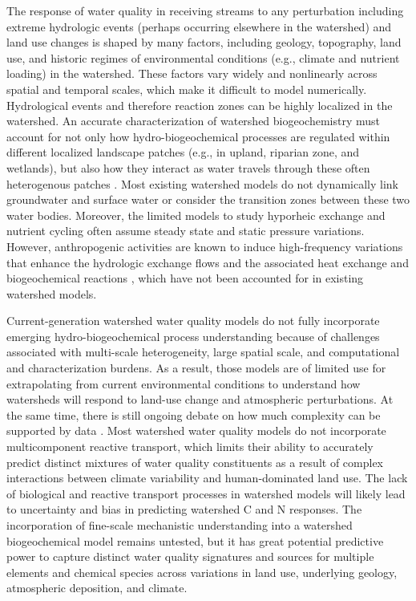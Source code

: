 \documentclass[preprint,review, 12pt]{elsarticle}
\begin{document}
 The response of water quality in receiving streams to any perturbation including extreme hydrologic events (perhaps occurring elsewhere in the watershed) and land use changes is shaped by many factors, including geology, topography, land use, and historic regimes of environmental conditions (e.g., climate and nutrient loading) in the watershed. These factors vary widely and nonlinearly across spatial and temporal scales, which make it difficult to model numerically. Hydrological events \citep{Lu2017a} and therefore reaction zones \citep{McClain2003} can be highly localized in the watershed. An accurate characterization of watershed biogeochemistry must account for not only how hydro-biogeochemical processes are regulated within different localized landscape patches (e.g., in upland, riparian zone, and wetlands), but also how they interact as water travels through these often heterogenous patches \citep{Laudon2018b}. Most existing watershed models do not dynamically link groundwater and surface water or consider the transition zones between these two water bodies. Moreover, the limited models to study hyporheic exchange and nutrient cycling often assume steady state and static pressure variations. However, anthropogenic activities are known to induce high-frequency variations that enhance the hydrologic exchange flows and the associated heat exchange and biogeochemical reactions \citep{Shuai2019b,Song2018b}, which have not been accounted for in existing watershed models.

Current-generation watershed water quality models do not fully incorporate emerging hydro-biogeochemical process understanding because of challenges associated with multi-scale heterogeneity, large spatial scale, and computational and characterization burdens. As a result, those models are of limited use for extrapolating from current environmental conditions to understand how watersheds will respond to land-use change and atmospheric perturbations. At the same time, there is still ongoing debate on how much complexity can be supported by data \citep{Jackson-Blakea}. Most watershed water quality models \citep{Kaushal2018f, Vidon2018} do not incorporate multicomponent reactive transport, which limits their ability to accurately predict distinct mixtures of water quality constituents \citep{Kaushal2018f} as a result of complex interactions between climate variability and human-dominated land use. The lack of biological and reactive transport processes in watershed models will likely lead to uncertainty and bias in predicting watershed C and N responses. The incorporation of fine-scale mechanistic understanding into a watershed biogeochemical model remains untested, but it has great potential predictive power to capture distinct water quality signatures and sources for multiple elements and chemical species across variations in land use, underlying geology, atmospheric deposition, and climate. 
\end{document}

